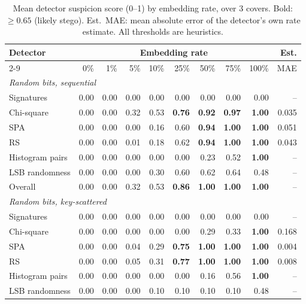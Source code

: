 \begin{table}[htbp]\centering\small
\caption{Mean detector suspicion score (0--1) by embedding rate, over 3 covers. Bold: $\geq 0.65$ (likely stego). Est.\ MAE: mean absolute error of the detector's own rate estimate. All thresholds are heuristics.}
\label{tab:detection}
\begin{tabular}{lrrrrrrrrr}
\toprule
Detector & \multicolumn{8}{c}{Embedding rate} & Est. \\
\cmidrule(lr){2-9}
 & 0\% & 1\% & 5\% & 10\% & 25\% & 50\% & 75\% & 100\% & MAE \\
\midrule
\multicolumn{10}{l}{\emph{Random bits, sequential}} \\
Signatures & 0.00 & 0.00 & 0.00 & 0.00 & 0.00 & 0.00 & 0.00 & 0.00 & -- \\
Chi-square & 0.00 & 0.00 & 0.32 & 0.53 & \textbf{0.76} & \textbf{0.92} & \textbf{0.97} & \textbf{1.00} & 0.035 \\
SPA & 0.00 & 0.00 & 0.00 & 0.16 & 0.60 & \textbf{0.94} & \textbf{1.00} & \textbf{1.00} & 0.051 \\
RS & 0.00 & 0.00 & 0.01 & 0.18 & 0.62 & \textbf{0.94} & \textbf{1.00} & \textbf{1.00} & 0.043 \\
Histogram pairs & 0.00 & 0.00 & 0.00 & 0.00 & 0.00 & 0.23 & 0.52 & \textbf{1.00} & -- \\
LSB randomness & 0.00 & 0.00 & 0.00 & 0.30 & 0.60 & 0.62 & 0.64 & 0.48 & -- \\
Overall & 0.00 & 0.00 & 0.32 & 0.53 & \textbf{0.86} & \textbf{1.00} & \textbf{1.00} & \textbf{1.00} & -- \\
\midrule
\multicolumn{10}{l}{\emph{Random bits, key-scattered}} \\
Signatures & 0.00 & 0.00 & 0.00 & 0.00 & 0.00 & 0.00 & 0.00 & 0.00 & -- \\
Chi-square & 0.00 & 0.00 & 0.00 & 0.00 & 0.00 & 0.29 & 0.33 & \textbf{1.00} & 0.168 \\
SPA & 0.00 & 0.00 & 0.04 & 0.29 & \textbf{0.75} & \textbf{1.00} & \textbf{1.00} & \textbf{1.00} & 0.004 \\
RS & 0.00 & 0.00 & 0.05 & 0.31 & \textbf{0.77} & \textbf{1.00} & \textbf{1.00} & \textbf{1.00} & 0.008 \\
Histogram pairs & 0.00 & 0.00 & 0.00 & 0.00 & 0.00 & 0.16 & 0.56 & \textbf{1.00} & -- \\
LSB randomness & 0.00 & 0.00 & 0.00 & 0.10 & 0.10 & 0.10 & 0.10 & 0.48 & -- \\

\end{tabular}
\end{table}
